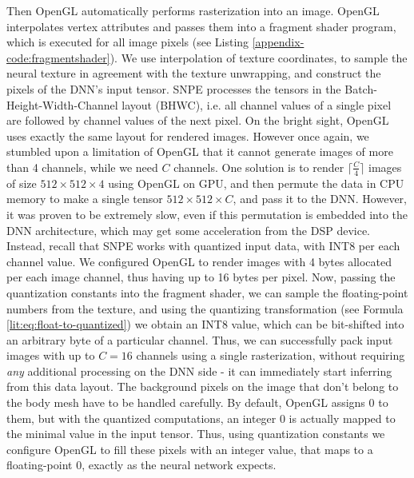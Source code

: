 Then OpenGL automatically performs rasterization into an image. OpenGL interpolates vertex attributes and passes them into a fragment shader program, which is executed for all image pixels (see Listing \ref{appendix-code:fragmentshader}). We use interpolation of texture coordinates, to sample the neural texture in agreement with the texture unwrapping, and construct the pixels of the DNN's input tensor. SNPE processes the tensors in the Batch-Height-Width-Channel layout (BHWC), i.e. all channel values of a single pixel are followed by channel values of the next pixel. On the bright sight, OpenGL uses exactly the same layout for rendered images. However once again, we stumbled upon a limitation of OpenGL that it cannot generate images of more than 4 channels, while we need $C$ channels. One solution is to render $\lceil \tfrac{C}{4} \rceil$ images of size $512 \times 512 \times 4$ using OpenGL on GPU, and then permute the data in CPU memory to make a single tensor $512 \times 512 \times C$, and pass it to the DNN. However, it was proven to be extremely slow, even if this permutation is embedded into the DNN architecture, which may get some acceleration from the DSP device. Instead, recall that SNPE works with quantized input data, with INT8 per each channel value. We configured OpenGL to render images with 4 bytes allocated per each image channel, thus having up to 16 bytes per pixel. Now, passing the quantization constants into the fragment shader, we can sample the floating-point numbers from the texture, and using the quantizing transformation (see Formula \ref{lit:eq:float-to-quantized}) we obtain an INT8 value, which can be bit-shifted into an arbitrary byte of a particular channel. Thus, we can successfully pack input images with up to $C = 16$ channels using a single rasterization, without requiring \textit{any} additional processing on the DNN side - it can immediately start inferring from this data layout. The background pixels on the image that don't belong to the body mesh have to be handled carefully. By default, OpenGL assigns 0 to them, but with the quantized computations, an integer 0 is actually mapped to the minimal value in the input tensor. Thus, using quantization constants we configure OpenGL to fill these pixels with an integer value, that maps to a floating-point 0, exactly as the neural network expects.

